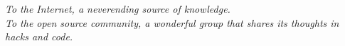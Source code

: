 \newpage
\vspace*{\fill}
\begin{center}
\textit{To the Internet, a neverending source of knowledge.\\
To the open source community, a wonderful group that shares its thoughts in hacks and code.}
\end{center}
\vspace*{\fill}
